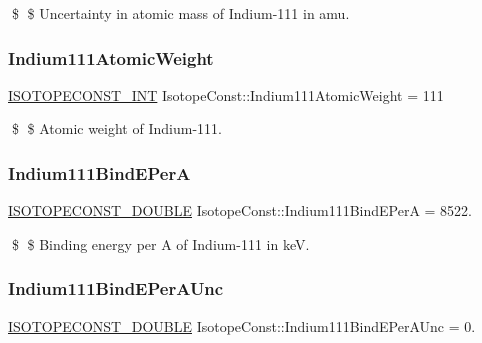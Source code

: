 \$ \$ Uncertainty in atomic mass of Indium-\/111 in amu. \mbox{\label{group___isotope_const-_indium-_in111_ga4fa71fd73e3407bbdec8f46c392579f2}} 
\subsubsection{\texorpdfstring{Indium111\+Atomic\+Weight}{Indium111AtomicWeight}}
{\footnotesize\ttfamily \mbox{\hyperlink{group___isotope_const-_macros_ga5f18360b3e99483a35c32d789e62621c}{I\+S\+O\+T\+O\+P\+E\+C\+O\+N\+S\+T\+\_\+\+I\+NT}} Isotope\+Const\+::\+Indium111\+Atomic\+Weight = 111}

\$ \$ Atomic weight of Indium-\/111. \mbox{\label{group___isotope_const-_indium-_in111_ga27595fed4bdffc24a60418c9b7b969eb}} 
\subsubsection{\texorpdfstring{Indium111\+Bind\+E\+PerA}{Indium111BindEPerA}}
{\footnotesize\ttfamily \mbox{\hyperlink{group___isotope_const-_macros_ga8f45a7272ce02c0b4c65c44636ed719a}{I\+S\+O\+T\+O\+P\+E\+C\+O\+N\+S\+T\+\_\+\+D\+O\+U\+B\+LE}} Isotope\+Const\+::\+Indium111\+Bind\+E\+PerA = 8522.}

\$ \$ Binding energy per A of Indium-\/111 in keV. \mbox{\label{group___isotope_const-_indium-_in111_gac0c170364e674949b2d1730ecacbb4c8}} 
\subsubsection{\texorpdfstring{Indium111\+Bind\+E\+Per\+A\+Unc}{Indium111BindEPerAUnc}}
{\footnotesize\ttfamily \mbox{\hyperlink{group___isotope_const-_macros_ga8f45a7272ce02c0b4c65c44636ed719a}{I\+S\+O\+T\+O\+P\+E\+C\+O\+N\+S\+T\+\_\+\+D\+O\+U\+B\+LE}} Isotope\+Const\+::\+Indium111\+Bind\+E\+Per\+A\+Unc = 0.}

